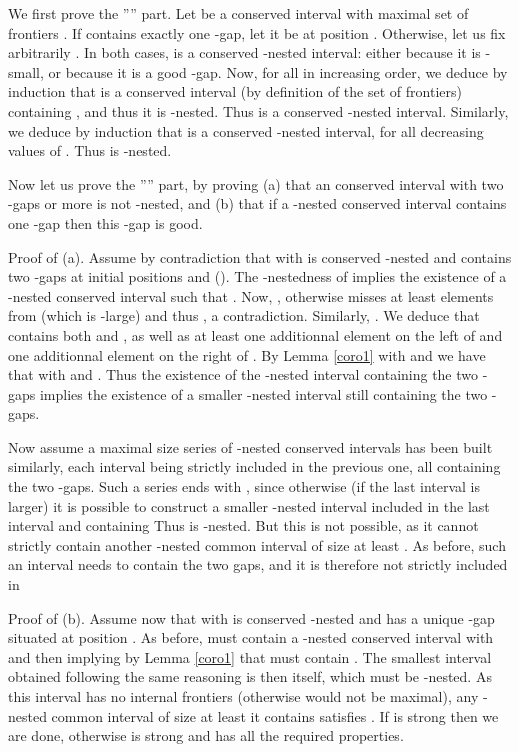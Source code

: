 \documentclass{article}
\begin{document}
\begin{preuve}

We first prove the '''' part.  Let  be a conserved
interval with maximal set of frontiers . If  contains exactly one -gap, let it be at position
. Otherwise, let us fix arbitrarily .  In both cases,  is a
conserved -nested interval: either because it is -small, or because
it is a good -gap. Now, for all  in increasing order, we deduce by
induction that   is a conserved interval (by definition of the set of
  frontiers) containing , and thus it is
  -nested. Thus  is a conserved -nested interval.
  Similarly, we deduce by induction that  is a conserved
  -nested interval, for all decreasing values of . Thus  is -nested.


Now let us prove the '''' part, by proving (a) that an
conserved interval with two -gaps or more is not -nested, and (b) that if
a -nested conserved interval contains one -gap then this -gap is good.


{\sf Proof of (a). } Assume by contradiction that  with  is
conserved -nested and contains two -gaps at initial positions  and 
(). The -nestedness of  implies the existence of a -nested
conserved interval  such that . Now,
, otherwise  misses at least 
elements from  (which is -large) and thus 
, a contradiction. Similarly, .
We deduce that  contains both  and , as well as at least one
additionnal element on the left of  and one additionnal element on the right of 
. By Lemma \ref{coro1} with  and  we have that 
with  and . Thus the existence of the -nested interval
 containing the two -gaps implies the existence of a smaller -nested
interval  still containing the two -gaps.

Now assume a maximal size series  of -nested conserved 
intervals has been built similarly, each interval being strictly included in the previous one, all containing
the two -gaps. Such a series ends with , since
otherwise (if the last interval is larger)  it is possible to construct a smaller -nested interval
included in the last interval and containing  Thus
 is -nested. But this is not possible, as it cannot 
strictly contain another -nested common interval of size at least 
. As before, such an interval needs to contain the two gaps, and
it is therefore not strictly included in 
 
{\sf Proof of (b).}  Assume now that  with  is
conserved -nested and has a unique -gap situated at position . As before,
 must contain a -nested conserved interval  with  and then
 implying by Lemma \ref{coro1} that  must contain
. The smallest interval obtained following the same reasoning is then
 itself, which must be -nested. As this interval has no internal frontiers
(otherwise  would not be maximal), any -nested common interval  of size at
least  it contains satisfies . If  is strong 
then we are done, otherwise  is strong and has all the required
properties. 
\end{preuve}
\end{document}
